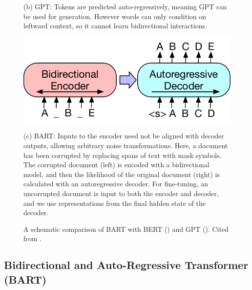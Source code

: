 \begin{figure}[ht!]
\begin{minipage}[t]{0.48\textwidth}
        \vspace{0.5em} %
        \parbox{\linewidth}{\small %
        (b) GPT: Tokens are predicted auto-regressively, meaning GPT can be used for generation. However words can only condition on leftward context, so it cannot learn bidirectional interactions.
        }
    \end{minipage}

    \vspace{1em} %

    \begin{minipage}[t]{\textwidth} %
        \centering
        \includegraphics[width=0.7\linewidth]{obrazky-figures/lm_archs/bart.pdf} %
        \vspace{0.5em} %
        \parbox{0.9\linewidth}{\small %
        (c) BART: Inputs to the encoder need not be aligned with decoder outputs, allowing arbitrary noise transformations. Here, a document has been corrupted by replacing spans of text with mask symbols. The corrupted document (left) is encoded with a bidirectional model, and then the likelihood of the original document (right) is calculated with an autoregressive decoder. For fine-tuning, an uncorrupted document is input to both the encoder and decoder, and we use representations from the final hidden state of the decoder.
        }
    \end{minipage}

    \caption{A schematic comparison of BART \cite{lewis2019bartdenoisingsequencetosequencepretraining} with BERT (\cite{devlin2018bert}) and GPT (\cite{radford2018improving}). Cited from \cite{lewis2019bartdenoisingsequencetosequencepretraining}.}
    \label{fig:model_comparison_schematics} %
\end{figure}


\subsection{Bidirectional and Auto-Regressive Transformer (BART)}
\label{subsec:bart}

